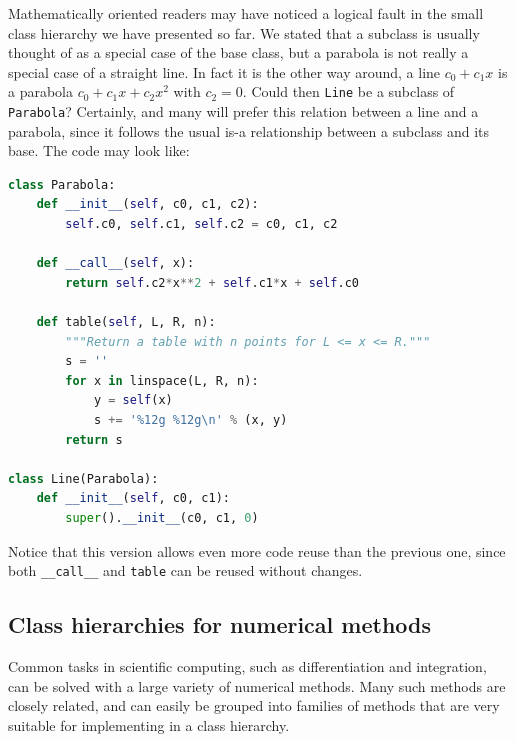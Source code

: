 \documentclass[graybox,envcountchap,sectrefs,final]{svmonodo}
\begin{document}
Mathematically oriented readers may have noticed a logical fault in the small class hierarchy we have presented so far. We stated that a subclass
is usually thought of as a special case of the base class, but a parabola is not really a special case of a straight line. In fact it is the
other way around, a line $c_0+c_1x$ is a parabola $c_0+c_1x+c_2x^2$ with $c_2=0$. Could then \texttt{Line} be a subclass of \texttt{Parabola}? Certainly, and many
will prefer this relation between a line and a parabola, since it follows the usual is-a relationship between a subclass and its base.
The code may look like:
\begin{lstlisting}[language=Python,style=blue1]
class Parabola:
    def __init__(self, c0, c1, c2):
        self.c0, self.c1, self.c2 = c0, c1, c2

    def __call__(self, x):
        return self.c2*x**2 + self.c1*x + self.c0

    def table(self, L, R, n):
        """Return a table with n points for L <= x <= R."""
        s = ''
        for x in linspace(L, R, n):
            y = self(x)
            s += '%12g %12g\n' % (x, y)
        return s

class Line(Parabola):
    def __init__(self, c0, c1):
        super().__init__(c0, c1, 0)
\end{lstlisting}
Notice that this version allows even more code reuse than the previous one, since both \Verb!__call__! and \texttt{table} can be reused without changes.


\subsection{Class hierarchies for numerical methods}
Common tasks in scientific computing, such as differentiation and integration,
can be solved with a large variety of numerical methods. Many such methods
are closely related, and can easily be grouped into families of methods that
are very suitable for implementing in a class hierarchy.
\end{document}
